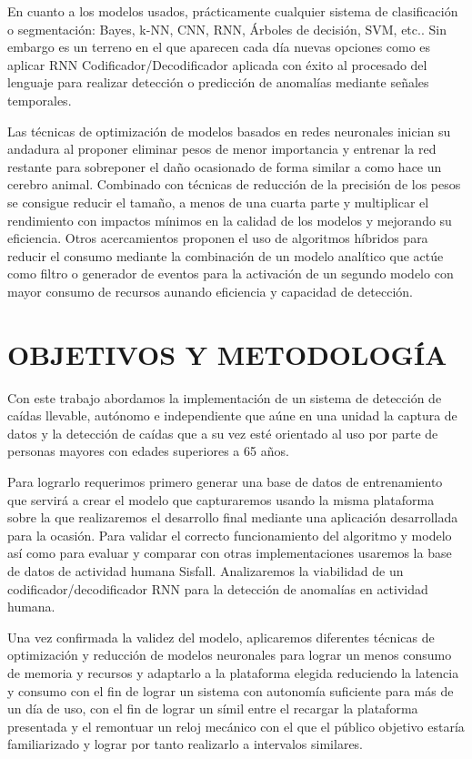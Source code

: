 \documentclass[11pt,a4paper,spanish,twocolumn]{article}
\begin{document}
En cuanto a los modelos usados, prácticamente cualquier sistema de clasificación o segmentación: Bayes, k-NN, CNN, RNN, Árboles de decisión, SVM, etc.\cite{Liu2018,Anita2020}. Sin embargo es un terreno en el que aparecen cada día nuevas opciones como es aplicar RNN Codificador/Decodificador aplicada con éxito al procesado del lenguaje\cite{Cho2014,Serban2017} para realizar detección o predicción de anomalías mediante señales temporales\cite{Park2018,Peng2018}. 

Las técnicas de optimización de modelos basados en redes neuronales inician su andadura al proponer eliminar pesos de menor importancia y entrenar la red restante para sobreponer el daño ocasionado\cite{RNN1986} de forma similar a como hace un cerebro animal. Combinado con técnicas de reducción de la precisión de los pesos se consigue reducir el tamaño, a menos de una cuarta parte y multiplicar el rendimiento con impactos mínimos en la calidad de los modelos y mejorando su eficiencia\cite{han2015,Guo2018,Jin2019}. Otros acercamientos proponen el uso de algoritmos híbridos para reducir el consumo mediante la combinación de un modelo analítico que actúe como filtro o generador de eventos para la activación de un segundo modelo con mayor consumo de recursos\cite{Lim2014, Putra2017} aunando eficiencia y capacidad de detección.

\section{OBJETIVOS Y METODOLOGÍA}
Con este trabajo abordamos la implementación de un sistema de detección de caídas llevable, autónomo e independiente que aúne en una unidad la captura de datos y la detección de caídas que a su vez esté orientado al uso por parte de personas mayores con edades superiores a 65 años.

Para lograrlo requerimos primero generar una base de datos de entrenamiento que servirá a crear el modelo que capturaremos usando la misma plataforma sobre la que realizaremos el desarrollo final mediante una aplicación desarrollada para la ocasión. Para validar el correcto funcionamiento del algoritmo y modelo así como para evaluar y comparar con otras implementaciones usaremos la base de datos de actividad humana Sisfall\cite{Sucerquia2017}. Analizaremos la viabilidad de un codificador/decodificador RNN para la detección de anomalías en actividad humana.

Una vez confirmada la validez del modelo, aplicaremos diferentes técnicas de optimización y reducción de modelos neuronales para lograr un menos consumo de memoria y recursos y adaptarlo a la plataforma elegida reduciendo la latencia y consumo con el fin de lograr un sistema con autonomía suficiente para más de un día de uso, con el fin de lograr un símil entre el recargar la plataforma presentada y el remontuar un reloj mecánico con el que el público objetivo estaría familiarizado y lograr por tanto realizarlo a intervalos similares.
\end{document}

